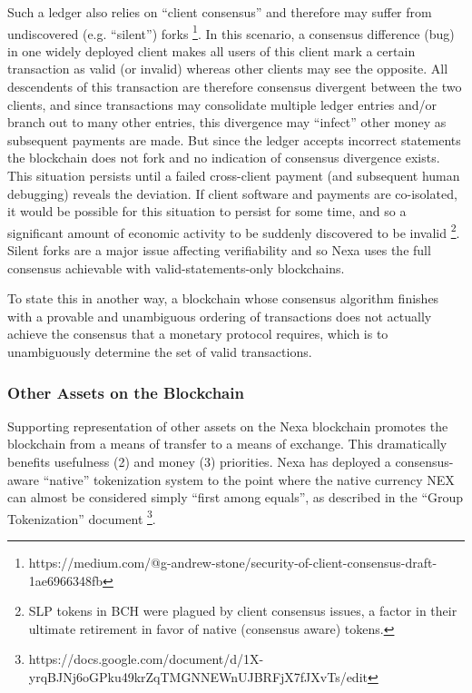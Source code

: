 \documentclass[a4paper, 11pt]{article}
\begin{document}
Such a ledger also relies on “client consensus” and therefore may suffer from undiscovered (e.g. “silent”) forks \footnote{https://medium.com/@g-andrew-stone/security-of-client-consensus-draft-1ae6966348fb}.  In this scenario, a consensus difference (bug) in one widely deployed client makes all users of this client mark a certain transaction as valid (or invalid) whereas other clients may see the opposite.  All descendents of this transaction are therefore consensus divergent between the two clients, and since transactions may consolidate multiple ledger entries and/or branch out to many other entries, this divergence may “infect” other money as subsequent payments are made.  But since the ledger accepts incorrect statements the blockchain does not fork and no indication of consensus divergence exists.  This situation persists until a failed cross-client payment (and subsequent human debugging) reveals the deviation.  If client software and payments are co-isolated, it would be possible for this situation to persist for some time, and so a significant amount of economic activity to be suddenly discovered to be invalid \footnote{SLP tokens in BCH were plagued by client consensus issues, a factor in their ultimate retirement in favor of native (consensus aware) tokens.}.  Silent forks are a major issue affecting verifiability and so Nexa uses the full consensus achievable with valid-statements-only blockchains.

To state this in another way, a blockchain whose consensus algorithm finishes with a provable and unambiguous ordering of transactions does not actually achieve the consensus that a monetary protocol requires, which is to unambiguously determine the set of valid transactions.

\subsubsection{Other Assets on the Blockchain}
Supporting representation of other assets on the Nexa blockchain promotes the blockchain from a means of transfer to a means of exchange.  This dramatically benefits usefulness (2) and money (3) priorities.  Nexa has deployed a consensus-aware “native” tokenization system to the point where the native currency NEX can almost be considered simply “first among equals”, as described in the “Group Tokenization” document \footnote{https://docs.google.com/document/d/1X-yrqBJNj6oGPku49krZqTMGNNEWnUJBRFjX7fJXvTs/edit}.  
\end{document}
